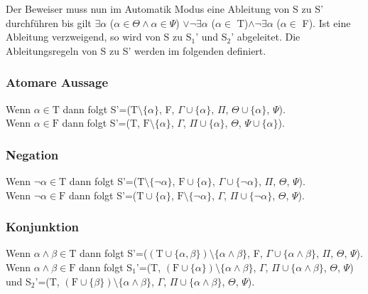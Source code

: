 Der Beweiser muss nun im Automatik Modus eine Ableitung von S zu S' durchführen bis gilt $\exists\alpha$ ($\alpha\in\Theta\wedge\alpha\in\Psi$) $\vee\neg\exists\alpha$ ($\alpha\in$ T)$\wedge\neg\exists\alpha$ ($\alpha\in$ F). Ist eine Ableitung verzweigend, so wird von S zu S$_{1}$' und S$_{2}$' abgeleitet. Die Ableitungsregeln von S zu S' werden im folgenden definiert.

\subsubsection{Atomare Aussage}
Wenn $\alpha\in\textrm{T}$ dann folgt S'=($\textrm{T}\setminus\lbrace\alpha\rbrace$, F, $\Gamma\cup\lbrace\alpha\rbrace$, $\Pi$, $\Theta\cup\lbrace\alpha\rbrace$, $\Psi$).\\
Wenn $\alpha\in\textrm{F}$ dann folgt S'=(T, $\textrm{F}\setminus\lbrace\alpha\rbrace$, $\Gamma$, $\Pi\cup\lbrace\alpha\rbrace$, $\Theta$, $\Psi\cup\lbrace\alpha\rbrace$).

\subsubsection{Negation}
Wenn $\neg\alpha\in\textrm{T}$ dann folgt S'=($\textrm{T}\setminus\lbrace\neg\alpha\rbrace$, $\textrm{F}\cup\lbrace\alpha\rbrace$, $\Gamma\cup\lbrace\neg\alpha\rbrace$, $\Pi$, $\Theta$, $\Psi$).\\
Wenn $\neg\alpha\in\textrm{F}$ dann folgt S'=($\textrm{T}\cup\lbrace\alpha\rbrace$, $\textrm{F}\setminus\lbrace\neg\alpha\rbrace$, $\Gamma$, $\Pi\cup\lbrace\neg\alpha\rbrace$, $\Theta$, $\Psi$).

\subsubsection{Konjunktion}
Wenn $\alpha\wedge\beta\in\textrm{T}$ dann folgt S'=($(\textrm{T}\cup\lbrace\alpha,\beta\rbrace)\setminus\lbrace\alpha\wedge\beta\rbrace$, F, $\Gamma\cup\lbrace\alpha\wedge\beta\rbrace$, $\Pi$, $\Theta$, $\Psi$).\\
Wenn $\alpha\wedge\beta\in\textrm{F}$ dann folgt S$_{1}$'=(T, $(\textrm{F}\cup\lbrace\alpha\rbrace)\setminus\lbrace\alpha\wedge\beta\rbrace$, $\Gamma$, $\Pi\cup\lbrace\alpha\wedge\beta\rbrace$, $\Theta$, $\Psi$) und S$_{2}$'=(T, $(\textrm{F}\cup\lbrace\beta\rbrace)\setminus\lbrace\alpha\wedge\beta\rbrace$, $\Gamma$, $\Pi\cup\lbrace\alpha\wedge\beta\rbrace$, $\Theta$, $\Psi$).

